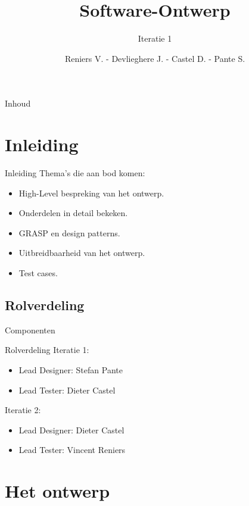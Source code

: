 \documentclass[t]{beamer}
\title{Software-Ontwerp}
\subtitle{Iteratie 1}
\author{Reniers V. - Devlieghere J. - Castel D. - Pante S.}
\institute{KU Leuven}
\begin{document}
\frame{\titlepage} 
\begin{frame}{Inhoud}
\begin{multicols}{2}
\tableofcontents
\end{multicols}
\end{frame}



\section{Inleiding} 
\begin{frame}{Inleiding} 
Thema's die aan bod komen:
\begin{itemize}
	\item High-Level bespreking van het ontwerp.
	\item Onderdelen in detail bekeken.
	\item GRASP en design patterns.
	\item Uitbreidbaarheid van het ontwerp.
	\item Test cases.
\end{itemize}
\end{frame}

\subsection{Rolverdeling}
\begin{frame}{Componenten}
\begin{multicols}{2}
\tableofcontents[currentsection]
\end{multicols}
\end{frame}

\begin{frame}{Rolverdeling}
Iteratie 1:
\begin{itemize}
	\item Lead Designer: Stefan Pante
	\item Lead Tester: Dieter Castel
\end{itemize}

Iteratie 2:
\begin{itemize}
	\item Lead Designer: Dieter Castel 
	\item Lead Tester: Vincent Reniers
\end{itemize}
\end{frame}

\section{Het ontwerp}
\end{document}
